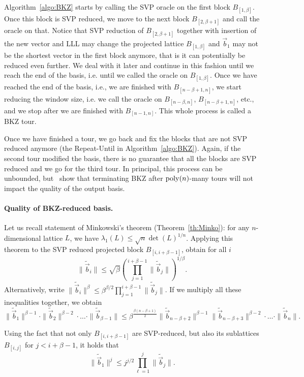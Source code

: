 Algorithm~\ref{algo:BKZ} starts by calling the SVP oracle on the first block $B_{[1,\beta]}$. Once this block is SVP reduced, we move to the next block $B_{[2,\beta+1]}$ and call the oracle on that. Notice that SVP reduction of $B_{[2,\beta+1]}$ together with insertion of the new vector and LLL may change the projected lattice $B_{[1,\beta]}$ and $\vec b_1$ may not be the shortest vector in the first block anymore, that is it can potentially be reduced even further. We deal with it later and continue in this fashion until we reach the end of the basis, i.e. until we called the oracle on $B_{[1,\beta]}$.  Once we have reached the end of the basis, i.e., we are finished with $B_{[n-\beta+1,n]}$, we start reducing the window size, i.e. we call the oracle on $B_{[{n-\beta},n]}$, $B_{[n-\beta+1,n]}$, etc., and we stop after we are finished with $B_{[n-1,n]}$. This whole process is called a BKZ tour.

Once we have finished a tour, we go back and fix the blocks that are not SVP reduced anymore (the Repeat-Until in Algorithm~\ref{algo:BKZ}).  Again, if the second tour modified the basis, there is no guarantee that all the blocks are SVP reduced and we go for the third tour. In principal, this process can be unbounded, but~\cite{HPS11} show that terminating BKZ after $\operatorname{poly}(n)$-many tours will not  impact the quality of the output basis.

\paragraph{Quality of BKZ-reduced basis.} Let us recall statement of Minkowski's theorem (Theorem~\ref{th:Minko}): for any $n$-dimensional lattice $L$, we have $\lambda_1(L) \leq \sqrt{n}\det(L)^{1/n}$. Applying this theorem to the SVP reduced projected block $B_{[i, i+\beta-1]}$, obtain for all $i$
	\[
		\| \tilde{\vec{b}}_i \| \leq \sqrt{\beta} \left( \prod_{j=1}^{i+\beta-1} \| \tilde{\vec{b}}_j \|  \right)^{1/\beta}.
	\]
Alternatively, write $\| \tilde{\vec{b}}_i \|^\beta \leq \beta^{\beta/2}  \prod_{j=1}^{i+\beta-1} \| \tilde{\vec{b}}_j \|  $. If we multiply all these inequalities together, we obtain 
\[
	\| \tilde{\vec{b}}_1 \|^{\beta-1} \cdot \| \tilde{\vec{b}}_2 \|^{\beta-2} \cdot \ldots \cdot \| \tilde{\vec{b}}_{\beta-1} \| \leq 
	\beta^{\frac{\beta(n-\beta+1)}{2}} \| \tilde{\vec{b}}_{n-\beta+2} \|^{\beta-1} \| \tilde{\vec{b}}_{n-\beta+3} \|^{\beta-2} \cdot \ldots \cdot  \|  \tilde{\vec{b}}_n\|.
\]

Using the fact that not only $B_{[i, i+\beta-1]}$ are SVP-reduced, but also its sublattices $B_{[i, j]}$  for $j<i+\beta-1$, it holds that
\[
	\|  \tilde{\vec{b}}_1   \|^j \leq j^{j/2} \prod_{\ell = 1}^{j} \| \tilde{\vec{b}}_j  \|.
\]

